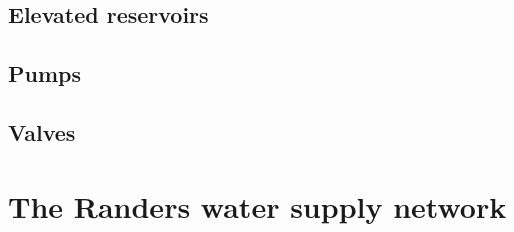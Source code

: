 \subsection{Elevated reservoirs}
\label{elevated_reservoirs}

\subsection{Pumps}
\label{pumps}

\subsection{Valves}
\label{valves}

\section{The Randers water supply network}
\label{the_randers_water_supply_network}